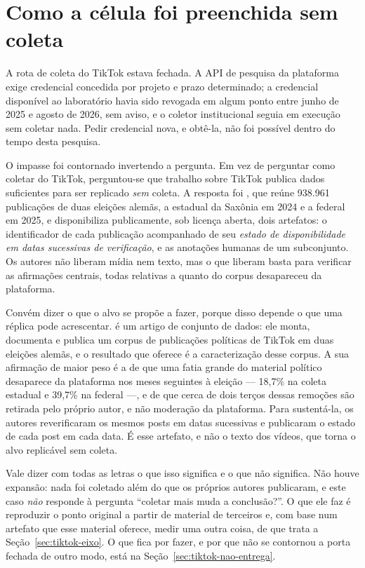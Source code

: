 \section{Como a célula foi preenchida sem coleta}

A rota de coleta do TikTok estava fechada. A API de pesquisa da plataforma exige
credencial concedida por projeto e prazo determinado; a credencial disponível ao
laboratório havia sido revogada em algum ponto entre junho de 2025 e agosto de 2026,
sem aviso, e o coletor institucional seguia em execução sem coletar nada. Pedir
credencial nova, e obtê-la, não foi possível dentro do tempo desta pesquisa.

O impasse foi contornado invertendo a pergunta. Em vez de perguntar como coletar do
TikTok, perguntou-se que trabalho sobre TikTok publica dados suficientes para ser
replicado \emph{sem} coleta. A resposta foi
, que reúne 938.961 publicações de duas eleições alemãs, a
estadual da Saxônia em 2024 e a federal em 2025, e disponibiliza publicamente, sob
licença aberta, dois artefatos: o identificador de cada publicação acompanhado de seu
\emph{estado de disponibilidade em datas sucessivas de verificação}, e as anotações
humanas de um subconjunto. Os autores não liberam mídia nem texto, mas o que liberam
basta para verificar as afirmações centrais, todas relativas a quanto do corpus
desapareceu da plataforma.

Convém dizer o que o alvo se propõe a fazer, porque disso depende o que uma réplica
pode acrescentar.  é um artigo de conjunto de dados: ele
monta, documenta e publica um corpus de publicações políticas de TikTok em duas
eleições alemãs, e o resultado que oferece é a caracterização desse corpus. A sua
afirmação de maior peso é a de que uma fatia grande do material político desaparece
da plataforma nos meses seguintes à eleição --- 18,7\% na coleta estadual e 39,7\% na
federal ---, e de que cerca de dois terços dessas remoções são retirada pelo próprio
autor, e não moderação da plataforma. Para sustentá-la, os autores reverificaram os
mesmos posts em datas sucessivas e publicaram o estado de cada post em cada data.
É esse artefato, e não o texto dos vídeos, que torna o alvo replicável sem coleta.

Vale dizer com todas as letras o que isso significa e o que não significa. Não
houve expansão: nada foi coletado além do que os próprios autores publicaram, e
este caso \emph{não} responde à pergunta ``coletar mais muda a conclusão?''. O que
ele faz é reproduzir o ponto original a partir de material de terceiros e, com base
num artefato que esse material oferece, medir uma outra coisa, de que trata a
Seção~\ref{sec:tiktok-eixo}. O que fica por fazer, e por que não se contornou a
porta fechada de outro modo, está na Seção~\ref{sec:tiktok-nao-entrega}.


